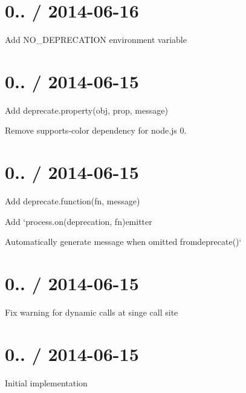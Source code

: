 \section*{0.. / 2014-\/06-\/16 }


\begin{DoxyItemize}
\item Add {\ttfamily N\+O\+\_\+\+D\+E\+P\+R\+E\+C\+A\+T\+I\+ON} environment variable
\end{DoxyItemize}

\section*{0.. / 2014-\/06-\/15 }


\begin{DoxyItemize}
\item Add {\ttfamily deprecate.\+property(obj, prop, message)}
\item Remove {\ttfamily supports-\/color} dependency for node.\+js 0.
\end{DoxyItemize}

\section*{0.. / 2014-\/06-\/15 }


\begin{DoxyItemize}
\item Add {\ttfamily deprecate.\+function(fn, message)}
\item Add `process.on(\textquotesingle{}deprecation\textquotesingle{}, fn){\ttfamily emitter}
\item {\ttfamily Automatically generate message when omitted from}deprecate()`
\end{DoxyItemize}

\section*{0.. / 2014-\/06-\/15 }


\begin{DoxyItemize}
\item Fix warning for dynamic calls at singe call site
\end{DoxyItemize}

\section*{0.. / 2014-\/06-\/15 }


\begin{DoxyItemize}
\item Initial implementation 
\end{DoxyItemize}
